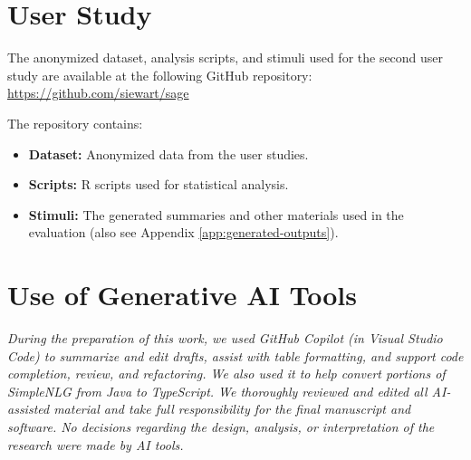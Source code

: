 \section{User Study}
\label{app:resources}
The anonymized dataset, analysis scripts, and stimuli used for the second user study are available at the following GitHub repository:
\url{https://github.com/siewart/sage}

The repository contains:
\begin{itemize}
  \item \textbf{Dataset:} Anonymized data from the user studies.
  \item \textbf{Scripts:} R scripts used for statistical analysis.
  \item \textbf{Stimuli:} The generated summaries and other materials used in the evaluation (also see Appendix \ref{app:generated-outputs}).
\end{itemize}

\section{Use of Generative AI Tools}
\label{app:ai-tools}
\textit{During the preparation of this work, we used GitHub Copilot (in Visual Studio Code) to summarize and edit drafts, assist with table formatting, and support code completion, review, and refactoring. We also used it to help convert portions of SimpleNLG from Java to TypeScript. We thoroughly reviewed and edited all AI-assisted material and take full responsibility for the final manuscript and software. No decisions regarding the design, analysis, or interpretation of the research were made by AI tools.}
